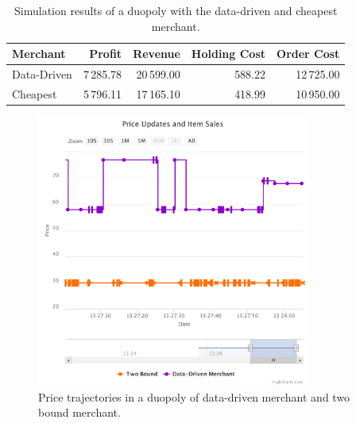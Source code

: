\begin{table}[t]
	\centering
	\begin{tabular}{lrrrr}
		\toprule
		Merchant & Profit & Revenue & Holding Cost & Order Cost \\
		\midrule
		Data-Driven & 7\,285.78 & 20\,599.00 & 588.22 & 12\,725.00 \\
		Cheapest & 5\,796.11 & 17\,165.10 & 418.99 & 10\,950.00 \\
		\bottomrule
	\end{tabular}
	\caption{Simulation results of a duopoly with the data-driven and cheapest merchant.}
	\label{tab:duopoly_cheapest}
\end{table}


\begin{figure}[t]
	\centering
	\includegraphics[width=0.8\textwidth]{figures/duopoly_bound_prices}
	\caption{Price trajectories in a duopoly of data-driven merchant and two bound merchant.}
	\label{fig:duopoly_bound_prices}
\end{figure}

